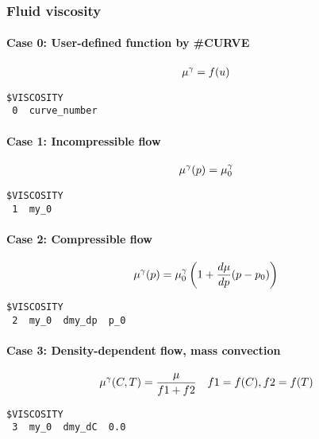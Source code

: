 \subsubsection{Fluid viscosity}
\paragraph*{Case 0: User-defined function by \#CURVE}
\begin{eqnarray}
\mu^\gamma= f(u)
\end{eqnarray}
\begin{verbatim}
$VISCOSITY
 0  curve_number
\end{verbatim}

\paragraph*{Case 1: Incompressible flow}
\begin{eqnarray}
\mu^\gamma(p) = \mu_0^\gamma
\end{eqnarray}
\begin{verbatim}
$VISCOSITY
 1  my_0
\end{verbatim}

\paragraph*{Case 2: Compressible flow}
\begin{eqnarray}
\mu^\gamma(p)
=
\mu_0^\gamma \left(1 + \frac{d\mu}{dp} (p-p_0)\right)
\end{eqnarray}
\begin{verbatim}
$VISCOSITY
 2  my_0  dmy_dp  p_0
\end{verbatim}

\paragraph*{Case 3: Density-dependent flow, mass convection}
\begin{eqnarray}
\mu^\gamma(C,T)
=
\frac{\mu}{f1 + f2}
\quad
f1= f(C), f2=f(T)
\end{eqnarray}
\begin{verbatim}
$VISCOSITY
 3  my_0  dmy_dC  0.0
\end{verbatim}

